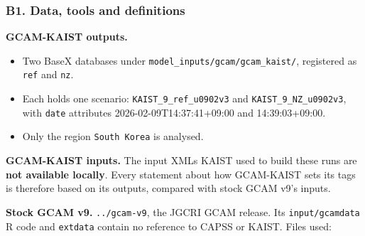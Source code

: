 \hypertarget{b1.-data-tools-and-definitions}{%
\subsubsection{B1.
Data,
tools and
definitions}\label{b1.-data-tools-and-definitions}}

\textbf{GCAM-KAIST
outputs.}

\begin{itemize}
\tightlist
\item
  Two
  BaseX
  databases
  under
  \texttt{model\_\allowbreak{}inputs/\allowbreak{}gcam/\allowbreak{}gcam\_\allowbreak{}kaist/\allowbreak{}},
  registered
  as
  \texttt{ref}
  and
  \texttt{nz}.
\item
  Each
  holds
  one
  scenario:
  \texttt{KAIST\_\allowbreak{}9\_\allowbreak{}ref\_\allowbreak{}u0902v3}
  and
  \texttt{KAIST\_\allowbreak{}9\_\allowbreak{}NZ\_\allowbreak{}u0902v3},
  with
  \texttt{date}
  attributes
  2026-02-09T14:37:41+09:00
  and
  14:39:03+09:00.
\item
  Only the
  region
  \texttt{South\ Korea}
  is
  analysed.
\end{itemize}

\textbf{GCAM-KAIST
inputs.}
The input
XMLs KAIST
used to
build
these runs
are
\textbf{not
available
locally}.
Every
statement
about how
GCAM-KAIST
sets its
tags is
therefore
based on
its
outputs,
compared
with stock
GCAM v9's
inputs.

\textbf{Stock
GCAM v9.}
\texttt{.\allowbreak{}.\allowbreak{}/\allowbreak{}gcam-\allowbreak{}v9},
the JGCRI
GCAM
release.
Its
\texttt{input/\allowbreak{}gcamdata}
R code and
\texttt{extdata}
contain no
reference
to CAPSS
or KAIST.
Files
used:

